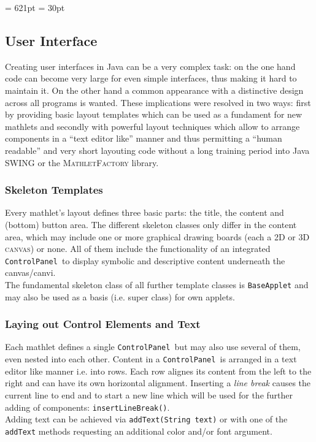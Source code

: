 \documentclass[a4paper,12pt]{article}
\newcommand{\name}[1]{\textsc{#1}}
\newcommand{\codename}[1]{\texttt{\small #1}}
\newcommand{\mf}{\name{MathletFactory }}
\newcommand{\cp}{\codename{ControlPanel }}
\begin{document}
\textheight = 621pt
\newpage
\footskip = 30pt

\subsection{User Interface}

Creating user interfaces in Java can be a very complex task: on the one hand code can become very large
for even simple interfaces, thus making it hard to maintain it. On the other hand a common appearance
with a distinctive design across all programs is wanted. These implications were resolved in two ways:
first by providing basic layout templates which can be used as a fundament for new mathlets and secondly
with powerful layout techniques which allow to arrange components in a ``text editor like'' manner and 
thus permitting a ``human readable'' and very short layouting code without a long training period into
Java SWING or the \mf library.\\

\subsubsection*{Skeleton Templates}

Every mathlet's layout defines three basic parts: the title, the content and (bottom) button area.
The different skeleton classes only differ in the content area, which may include one or more
graphical drawing boards (each a 2D or 3D \name{canvas}) or none. All of them include the functionality 
of an integrated \cp to display symbolic and descriptive content underneath the canvas/canvi.\\
The fundamental skeleton class of all further template classes is \codename{BaseApplet} and may also be used
as a basis (i.e. super class) for own applets.

\subsubsection*{Laying out Control Elements and Text}

Each mathlet defines a single \cp but may also use several of them, even nested into each other.
Content in a \cp is arranged in a text editor like manner i.e. into rows. Each row alignes its content
from the left to the right and can have its own horizontal alignment. Inserting a \textit{line break}
causes the current line to end and to start a new line which will be used for the further adding of 
components: \codename{insertLineBreak()}.\\
Adding text can be achieved via \codename{addText(String text)} or with one of the \codename{addText} methods
requesting an additional color and/or font argument.
\end{document}

